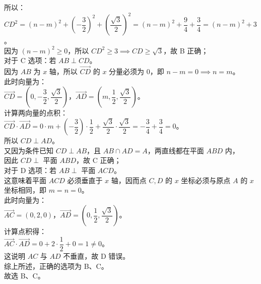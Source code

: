 {  所以：\\
  \(CD^2 = (n - m)^2 + \left(-\dfrac{3}{2}\right)^2 + \left(\dfrac{\sqrt{3}}{2}\right)^2 = (n - m)^2 + \dfrac{9}{4} + \dfrac{3}{4} = (n - m)^2 + 3\)。\\
  因为 \((n - m)^2 \geqslant 0\)，所以 \(CD^2 \geqslant 3 \implies CD \geqslant \sqrt{3}\)，故 B 正确；\\
  对于 C 选项：若 \(AB \perp CD\)。\\
  因为 \(AB\) 为 \(x\) 轴，所以 \(\vec{CD}\) 的 \(x\) 分量必须为 0，即 \(n - m = 0 \implies n = m\)。\\
  此时向量为：\\
  \(\vec{CD} = \left(0, -\dfrac{3}{2}, \dfrac{\sqrt{3}}{2}\right)\)，\(\vec{AD} = \left(m, \dfrac{1}{2}, \dfrac{\sqrt{3}}{2}\right)\)。\\
  计算两向量的点积：\\
  \(\vec{CD} \cdot \vec{AD} = 0 \cdot m + \left(-\dfrac{3}{2}\right) \cdot \dfrac{1}{2} + \dfrac{\sqrt{3}}{2} \cdot \dfrac{\sqrt{3}}{2} = -\dfrac{3}{4} + \dfrac{3}{4} = 0\)。\\
  所以 \(CD \perp AD\)。\\
  又因为条件已知 \(CD \perp AB\)，且 \(AB \cap AD = A\)，两直线都在平面 \(ABD\) 内，\\
  因此 \(CD \perp\) 平面 \(ABD\)，故 C 正确；\\
  对于 D 选项：若 \(AB \perp\) 平面 \(ACD\)。\\
  这意味着平面 \(ACD\) 必须垂直于 \(x\) 轴，因而点 \(C, D\) 的 \(x\) 坐标必须与原点 \(A\) 的 \(x\) 坐标相同，即 \(m = n = 0\)。\\
  此时向量为：\\
  \(\vec{AC} = (0, 2, 0)\)，\(\vec{AD} = \left(0, \dfrac{1}{2}, \dfrac{\sqrt{3}}{2}\right)\)。\\
  计算点积得：\\
  \(\vec{AC} \cdot \vec{AD} = 0 + 2 \cdot \dfrac{1}{2} + 0 = 1 \neq 0\)。\\
  这说明 \(AC\) 与 \(AD\) 不垂直，故 D 错误。\\
  综上所述，正确的选项为 B、C。\\
  故选 B、C。%
}

\newcommand{\qSolidDihedralDistanceDiagnosis}{%
  立体几何多选题往往逻辑关系复杂，仅凭空间想象容易产生漏判或错判（例如直观想象中很容易将 A 判定为正确）。本题通过建立坐标系，将空间几何关系转化为代数不等式和向量点积，属于难度较大的题目。%
}

\newcommand{\qSolidDihedralDistanceTeachingNotes}{%
  这道题是空间坐标法（向量法）解决几何关系选择题的经典案例。授课时应着重讲解如何将“距离为 2 和 1”及“二面角为 60 度”翻译为坐标设法。让学生认识到：几何直觉不够时，代数坐标化是最安全、最确凿的武器。%
}
